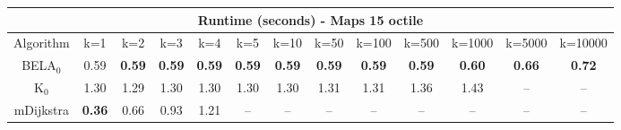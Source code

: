 \begin{tabular}{c|cccccccccccc}\toprule
\multicolumn{13}{c}{Runtime (seconds) - Maps 15 octile}\\ \midrule
Algorithm & k=1 & k=2 & k=3 & k=4 & k=5 & k=10 & k=50 & k=100 & k=500 & k=1000 & k=5000 & k=10000 \\ \midrule
BELA$_0$ & 0.59 & \textbf{0.59} & \textbf{0.59} & \textbf{0.59} & \textbf{0.59} & \textbf{0.59} & \textbf{0.59} & \textbf{0.59} & \textbf{0.59} & \textbf{0.60} & \textbf{0.66} & \textbf{0.72} \\
K$_0$ & 1.30 & 1.29 & 1.30 & 1.30 & 1.30 & 1.30 & 1.31 & 1.31 & 1.36 & 1.43 & -- & -- \\
mDijkstra & \textbf{0.36} & 0.66 & 0.93 & 1.21 & -- & -- & -- & -- & -- & -- & -- & -- \\ \bottomrule 
\end{tabular}

